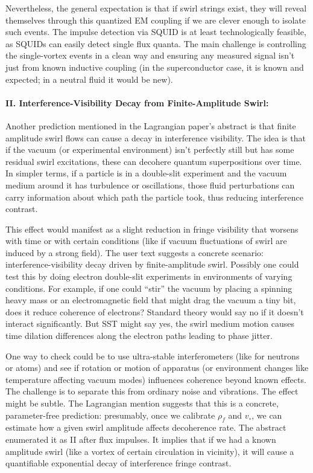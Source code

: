 \documentclass[10pt,reprint,aps,onecolumn,nofootinbib]{revtex4-2}
\newcommand{\rhoF}{\rho_{\!f}}     %
\begin{document}
Nevertheless, the general expectation is that if swirl strings exist, they will reveal themselves through this quantized EM coupling if we are clever enough to isolate such events. The impulse detection via SQUID is at least technologically feasible, as SQUIDs can easily detect single flux quanta. The main challenge is controlling the single-vortex events in a clean way and ensuring any measured signal isn’t just from known inductive coupling (in the superconductor case, it is known and expected; in a neutral fluid it would be new).


\paragraph{II. Interference-Visibility Decay from Finite-Amplitude Swirl:}

Another prediction mentioned in the Lagrangian paper’s abstract is that finite amplitude swirl flows can cause a decay in interference visibility. The idea is that if the vacuum (or experimental environment) isn’t perfectly still but has some residual swirl excitations, these can decohere quantum superpositions over time. In simpler terms, if a particle is in a double-slit experiment and the vacuum medium around it has turbulence or oscillations, those fluid perturbations can carry information about which path the particle took, thus reducing interference contrast.


This effect would manifest as a slight reduction in fringe visibility that worsens with time or with certain conditions (like if vacuum fluctuations of swirl are induced by a strong field). The user text suggests a concrete scenario: interference-visibility decay driven by finite-amplitude swirl. Possibly one could test this by doing electron double-slit experiments in environments of varying conditions. For example, if one could “stir” the vacuum by placing a spinning heavy mass or an electromagnetic field that might drag the vacuum a tiny bit, does it reduce coherence of electrons? Standard theory would say no if it doesn’t interact significantly. But SST might say yes, the swirl medium motion causes time dilation differences along the electron paths leading to phase jitter.


One way to check could be to use ultra-stable interferometers (like for neutrons or atoms) and see if rotation or motion of apparatus (or environment changes like temperature affecting vacuum modes) influences coherence beyond known effects. The challenge is to separate this from ordinary noise and vibrations. The effect might be subtle. The Lagrangian mention suggests that this is a concrete, parameter-free prediction: presumably, once we calibrate $\rhoF$ and $v_{\circ}$, we can estimate how a given swirl amplitude affects decoherence rate. The abstract enumerated it as II after flux impulses. It implies that if we had a known amplitude swirl (like a vortex of certain circulation in vicinity), it will cause a quantifiable exponential decay of interference fringe contrast.
\end{document}
